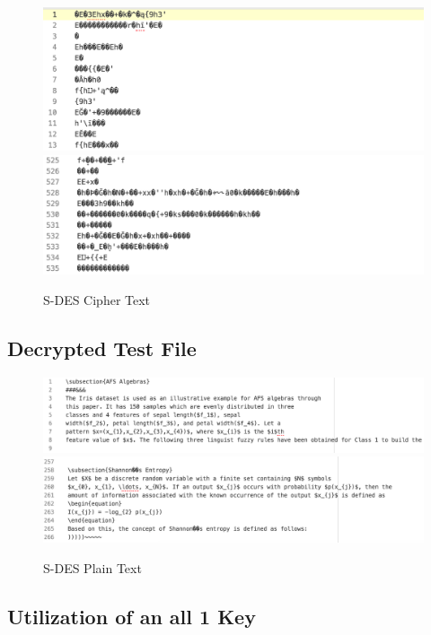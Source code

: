 \documentclass[]{article}
\begin{document}
\begin{figure}[H]
	\includegraphics[height=\textheight/6,width=\textwidth]{sdes_cipher1.png}
	\includegraphics[height=\textheight/6,width=\textwidth]{sdes_cipher2.png}	
	\caption{S-DES Cipher Text}
	\centering
\end{figure}

\vspace{0.5cm}
\subsection*{Decrypted Test File}

\begin{figure}[H]
	\includegraphics[width=\textwidth]{sdes_plain1.png}
	\includegraphics[width=\textwidth]{sdes_plain2.png}	
	\caption{S-DES Plain Text}
	\centering
\end{figure}

\newpage
\subsection*{Utilization of an all 1 Key}
\end{document}
